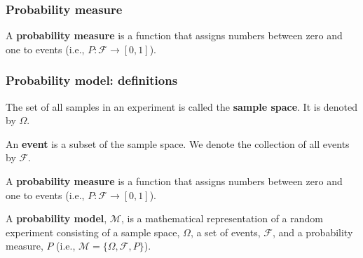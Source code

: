 \begin{frame}
    \frametitle{Probability measure}

    \begin{probDef}

        A \textbf{probability measure} is a function that assigns numbers
        between zero and one to events (i.e., $P:\mathcal{F}\rightarrow
        [0,1]$).

    \end{probDef}

\end{frame}

\begin{frame}
    \frametitle{Probability model: definitions}

    \begin{probDef*}

        The set of all samples in an experiment is called the \textbf{sample
        space}. It is denoted by $\Omega$.

    \end{probDef*}


    \footnotesize
    \begin{probDef*}[Event]

        An \textbf{event} is a subset of the sample space. We denote the
        collection of all events by $\mathcal{F}$.

    \end{probDef*}

    \begin{probDef*}

        A \textbf{probability measure} is a function that assigns numbers
        between zero and one to events (i.e., $P:\mathcal{F}\rightarrow
        [0,1]$).

    \end{probDef*}

    \begin{probDef*}

        A \textbf{probability model}, $\mathcal{M}$, is a mathematical representation of a
        random experiment consisting of a sample space, $\Omega$, a set of
        events, $\mathcal{F}$, and a probability measure, $P$ (i.e.,
        $\mathcal{M}=\{\Omega,\mathcal{F},P\}$).

    \end{probDef*}
    \normalsize

\end{frame}

